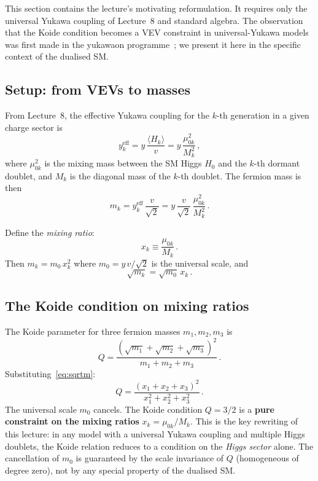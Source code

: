 \documentclass[11pt,a4paper]{article}
\theoremstyle{definition}\newtheorem{exercise}{Exercise}[section]
\begin{document}
This section contains the lecture's motivating reformulation.  It requires only
the universal Yukawa coupling of Lecture~8 and standard algebra.
The observation that the Koide condition becomes a VEV constraint
in universal-Yukawa models was first made in the yukawaon
programme~\cite{Koide1983,HabaKoide2008,Ma2007}; we present it
here in the specific context of the dualised SM.

\subsection{Setup: from VEVs to masses}

From Lecture~8, the effective Yukawa coupling for the $k$-th
generation in a given charge sector is
\begin{equation}
  y_k^{\text{eff}} = y\,\frac{\langle H_k\rangle}{v}
  = y\,\frac{\mu_{0k}^2}{M_k^2}\,,
  \label{eq:yk}
\end{equation}
where $\mu_{0k}^2$ is the mixing mass between the SM Higgs $H_0$
and the $k$-th dormant doublet, and $M_k$ is the diagonal mass
of the $k$-th doublet.  The fermion mass is then
\begin{equation}
  m_k = y_k^{\text{eff}}\,\frac{v}{\sqrt{2}}
  = y\,\frac{v}{\sqrt{2}}\,\frac{\mu_{0k}^2}{M_k^2}\,.
  \label{eq:mk}
\end{equation}

Define the \emph{mixing ratio}:
\begin{equation}
  x_k \equiv \frac{\mu_{0k}}{M_k}\,.
  \label{eq:xk}
\end{equation}
Then $m_k = m_0\,x_k^2$ where $m_0 = y\,v/\sqrt{2}$ is the
universal scale, and
\begin{equation}
  \sqrt{m_k} = \sqrt{m_0}\,x_k\,.
  \label{eq:sqrtm}
\end{equation}

\subsection{The Koide condition on mixing ratios}

The Koide parameter for three fermion masses $m_1, m_2, m_3$ is
\begin{equation}
  Q = \frac{(\sqrt{m_1}+\sqrt{m_2}+\sqrt{m_3})^2}
  {m_1+m_2+m_3}\,.
  \label{eq:Q}
\end{equation}
Substituting~\eqref{eq:sqrtm}:
\begin{equation}
  \boxed{Q = \frac{(x_1+x_2+x_3)^2}{x_1^2+x_2^2+x_3^2}\,.}
  \label{eq:Qx}
\end{equation}
The universal scale $m_0$ cancels.  The Koide condition
$Q = 3/2$ is a \textbf{pure constraint on the mixing ratios}
$x_k = \mu_{0k}/M_k$.  This is the key rewriting of this
lecture: in any model with a universal Yukawa coupling and
multiple Higgs doublets, the Koide relation reduces to a
condition on the \emph{Higgs sector} alone.  The cancellation
of $m_0$ is guaranteed by the scale invariance of $Q$
(homogeneous of degree zero), not by any special property
of the dualised SM.
\end{document}
